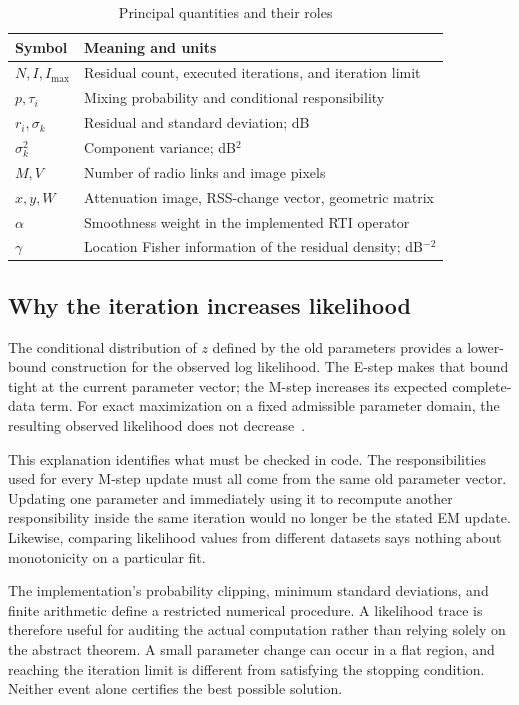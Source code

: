 \documentclass[conference,letterpaper]{IEEEtran}
\begin{document}
\begin{table}[t]
\caption{Principal quantities and their roles}
\label{tab:notation}
\centering\small
\begin{tabular}{@{}p{}p{}@{}}
\toprule
Symbol & Meaning and units\\\midrule
$N,I,I_{\max}$ & Residual count, executed iterations, and iteration limit\\
$p,\tau_i$ & Mixing probability and conditional responsibility\\
$r_i,\sigma_k$ & Residual and standard deviation; dB\\
$\sigma_k^2$ & Component variance; dB$^2$\\
$M,V$ & Number of radio links and image pixels\\
$x,y,W$ & Attenuation image, RSS-change vector, geometric matrix\\
$\alpha$ & Smoothness weight in the implemented RTI operator\\
$\gamma$ & Location Fisher information of the residual density; dB$^{-2}$\\
\bottomrule
\end{tabular}
\end{table}

\subsection{Why the iteration increases likelihood}
The conditional distribution of $z$ defined by the old parameters provides a lower-bound construction for the observed log likelihood. The E-step makes that bound tight at the current parameter vector; the M-step increases its expected complete-data term. For exact maximization on a fixed admissible parameter domain, the resulting observed likelihood does not decrease~\cite{dempster1977}.

This explanation identifies what must be checked in code. The responsibilities used for every M-step update must all come from the same old parameter vector. Updating one parameter and immediately using it to recompute another responsibility inside the same iteration would no longer be the stated EM update. Likewise, comparing likelihood values from different datasets says nothing about monotonicity on a particular fit.

The implementation's probability clipping, minimum standard deviations, and finite arithmetic define a restricted numerical procedure. A likelihood trace is therefore useful for auditing the actual computation rather than relying solely on the abstract theorem. A small parameter change can occur in a flat region, and reaching the iteration limit is different from satisfying the stopping condition. Neither event alone certifies the best possible solution.
\end{document}

